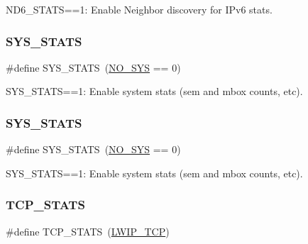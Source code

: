 N\+D6\+\_\+\+S\+T\+A\+TS==1\+: Enable Neighbor discovery for I\+Pv6 stats. \mbox{\label{group__lwip__opts__stats_ga0173549afa76553583e5a02c6a791218}} 
\subsubsection{\texorpdfstring{S\+Y\+S\+\_\+\+S\+T\+A\+TS}{SYS\_STATS}\hspace{0.1cm}{\footnotesize\ttfamily [1/2]}}
{\footnotesize\ttfamily \#define S\+Y\+S\+\_\+\+S\+T\+A\+TS~(\hyperlink{openmote-cc2538_2lwip_2test_2unit_2lwipopts_8h_ae00ba99de94a5bf84d832be8976df59b}{N\+O\+\_\+\+S\+YS} == 0)}

S\+Y\+S\+\_\+\+S\+T\+A\+TS==1\+: Enable system stats (sem and mbox counts, etc). \mbox{\label{group__lwip__opts__stats_ga0173549afa76553583e5a02c6a791218}} 
\subsubsection{\texorpdfstring{S\+Y\+S\+\_\+\+S\+T\+A\+TS}{SYS\_STATS}\hspace{0.1cm}{\footnotesize\ttfamily [2/2]}}
{\footnotesize\ttfamily \#define S\+Y\+S\+\_\+\+S\+T\+A\+TS~(\hyperlink{openmote-cc2538_2lwip_2test_2unit_2lwipopts_8h_ae00ba99de94a5bf84d832be8976df59b}{N\+O\+\_\+\+S\+YS} == 0)}

S\+Y\+S\+\_\+\+S\+T\+A\+TS==1\+: Enable system stats (sem and mbox counts, etc). \mbox{\label{group__lwip__opts__stats_gaa02ec5c5bc0edebe418680c54d044f58}} 
\subsubsection{\texorpdfstring{T\+C\+P\+\_\+\+S\+T\+A\+TS}{TCP\_STATS}\hspace{0.1cm}{\footnotesize\ttfamily [1/2]}}
{\footnotesize\ttfamily \#define T\+C\+P\+\_\+\+S\+T\+A\+TS~(\hyperlink{group__lwip__opts__tcp_gaa4ed98deb97b77c633cb8870f34c71e9}{L\+W\+I\+P\+\_\+\+T\+CP})}

